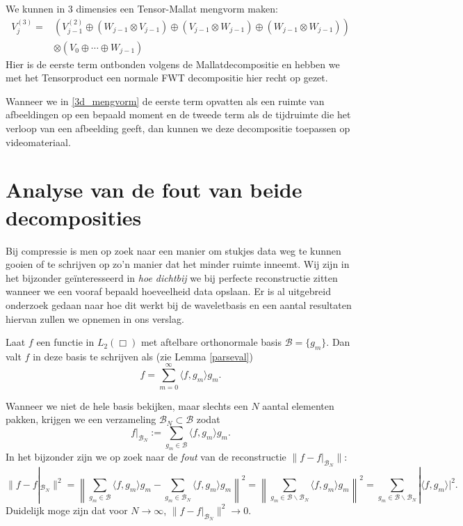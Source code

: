 \begin{voorbeeld}
We kunnen in 3 dimensies een Tensor-Mallat mengvorm maken:
\begin{equation}
\label{3d_mengvorm}
\begin{split}
V_j^{(3)} = &
\left (V^{(2)}_{j-1} 
\oplus (W_{j-1}\otimes V_{j-1}) 
\oplus (V_{j-1}\otimes W_{j-1}) 
\oplus (W_{j-1}\otimes W_{j-1}) \right ) \\
&\otimes (V_0\oplus\cdots\oplus W_{j-1})
\end{split}
\end{equation}
Hier is de eerste term ontbonden volgens de Mallatdecompositie en hebben we met het Tensorproduct
een normale FWT decompositie hier recht op gezet.
\end{voorbeeld}
\begin{gevolg}
Wanneer we in \ref{3d_mengvorm} de eerste term opvatten als een ruimte van afbeeldingen op een bepaald moment en
de tweede term als de tijdruimte die het verloop van een afbeelding geeft, dan kunnen we deze
decompositie toepassen op videomateriaal. 
\end{gevolg}

\section{Analyse van de fout van beide decomposities}
\label{daling_wavelet}

Bij compressie is men op zoek naar een manier om stukjes data weg te kunnen gooien of te schrijven op zo'n manier dat het minder ruimte inneemt. Wij zijn in het bijzonder ge\"interesseerd in \emph{hoe dichtbij} we bij perfecte reconstructie zitten wanneer we een vooraf bepaald hoeveelheid data opslaan. Er is al uitgebreid onderzoek gedaan naar hoe dit werkt bij de waveletbasis en een aantal resultaten hiervan zullen we opnemen in ons verslag.

Laat $f$ een functie in $L_2(\Box)$ met aftelbare orthonormale basis $\mathcal{B} = \{ g_m \}$. Dan valt $f$ in deze basis te schrijven als (zie Lemma \ref{parseval})
\begin{equation}
\label{linfout}
f = \sum_{m = 0}^\infty \langle f, g_m \rangle g_m.
\end{equation}

Wanneer we niet de hele basis bekijken, maar slechts een $N$ aantal elementen pakken, 
krijgen we een verzameling $\mathcal{B}_N \subset \mathcal{B}$ zodat
\[
f|_{\mathcal{B}_N} := \sum_{g_m \in \mathcal{B}} \langle f, g_m \rangle g_m.
\]
In het bijzonder zijn we op zoek naar de \emph{fout} van de reconstructie $\| f - f|_{\mathcal{B}_N} \|$:
\[
\| f - f|_{\mathcal{B}_N} \|^2 
= \left\| \sum_{g_m \in \mathcal{B}} \langle f, g_m \rangle g_m - 
\sum_{g_m\in\mathcal{B}_N} \langle f, g_m \rangle g_m \right\|^2 
= \left\| \sum_{g_m\in \mathcal{B}\backslash\mathcal{B}_N} \langle f, g_m \rangle g_m \right\|^2 
= \sum_{g_m\in \mathcal{B}\backslash\mathcal{B}_N} | \langle f, g_m \rangle |^2.
\]
Duidelijk moge zijn dat voor $N \to \infty$, $\| f - f|_{\mathcal{B}_N} \|^2 \to 0$.

